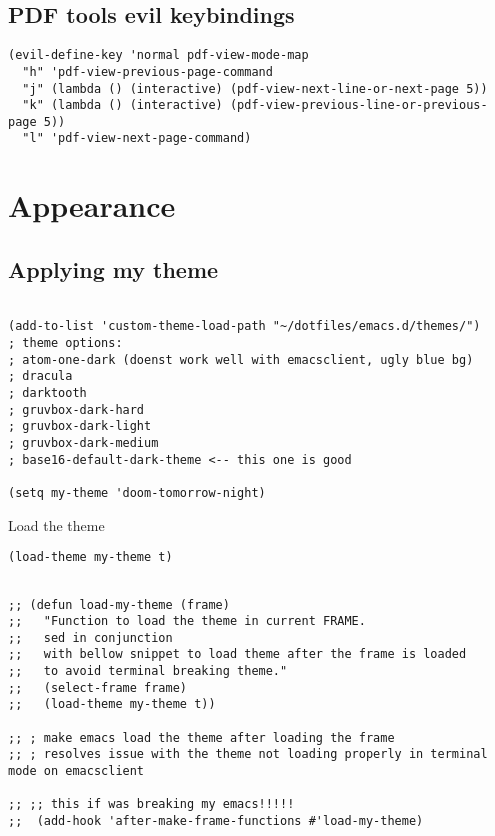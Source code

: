\documentclass[11pt]{article}
\begin{document}
\subsection*{PDF tools evil keybindings}
\label{sec:orgcbd8127}
\begin{verbatim}
(evil-define-key 'normal pdf-view-mode-map
  "h" 'pdf-view-previous-page-command
  "j" (lambda () (interactive) (pdf-view-next-line-or-next-page 5))
  "k" (lambda () (interactive) (pdf-view-previous-line-or-previous-page 5))
  "l" 'pdf-view-next-page-command)
\end{verbatim}



\section*{Appearance}
\label{sec:org98afe30}

\subsection*{Applying my theme}
\label{sec:org2c88349}

\begin{verbatim}

(add-to-list 'custom-theme-load-path "~/dotfiles/emacs.d/themes/")
; theme options:
; atom-one-dark (doenst work well with emacsclient, ugly blue bg)
; dracula
; darktooth
; gruvbox-dark-hard
; gruvbox-dark-light
; gruvbox-dark-medium
; base16-default-dark-theme <-- this one is good

(setq my-theme 'doom-tomorrow-night)

\end{verbatim}

Load the theme

\begin{verbatim}
(load-theme my-theme t)
\end{verbatim}


\begin{verbatim}

;; (defun load-my-theme (frame)
;;   "Function to load the theme in current FRAME.
;;   sed in conjunction
;;   with bellow snippet to load theme after the frame is loaded
;;   to avoid terminal breaking theme."
;;   (select-frame frame)
;;   (load-theme my-theme t))

;; ; make emacs load the theme after loading the frame
;; ; resolves issue with the theme not loading properly in terminal mode on emacsclient

;; ;; this if was breaking my emacs!!!!!
;;  (add-hook 'after-make-frame-functions #'load-my-theme)
\end{verbatim}
\end{document}
